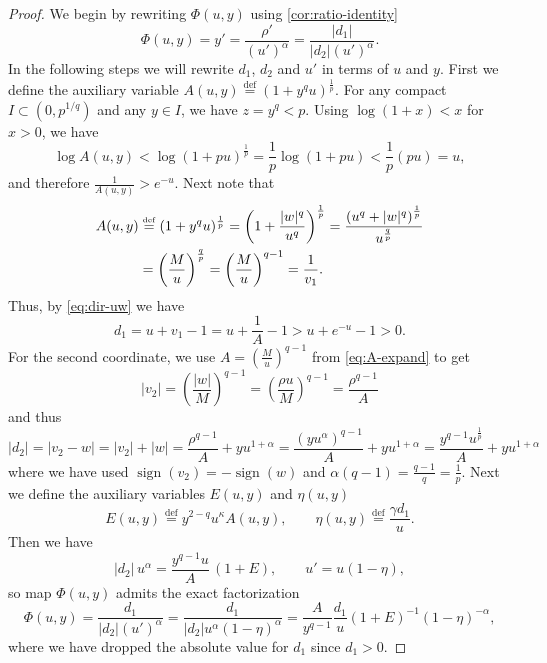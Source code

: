 \documentclass{article}
\DeclareMathOperator{\sign}{sign}
\newcommand{\defi}{\stackrel{\mathrm{\scriptscriptstyle def}}{=}}
\begin{document}
\begin{proof}
    We begin by rewriting $\Phi(u,y)$ using \cref{cor:ratio-identity}
    \begin{equation}\label{eq:yprime-ratio}
        \Phi(u,y)= y'
        = \frac{\rho'}{(u')^\alpha}
        = \frac{|d_1|}{|d_2|(u')^\alpha}.
    \end{equation}
    In the following steps we will rewrite $d_1$, $d_2$ and $u'$ in terms of $u$ and $y$.
    First we define the auxiliary variable $A(u,y)\defi (1+y^q u)^{\frac1p}$.
    For any compact $I \subset (0,p^{1/q})$ and any $y \in I$, we have $z = y^q < p$.
    Using $\log(1+x) < x$ for $x > 0$, we have
    \[
        \log A(u,y) < \log (1+p u)^{\frac1p} = \frac1p \log (1+p u) < \frac1p (p u) = u,
    \]
    and therefore $\frac{1}{A(u,y)} > e^{-u}$.
    Next note that
    \begin{align}
        \label{eq:A-expand}
        A(u,y)&\defi (1+y^q u)^{\frac1p}
        = \left( 1 + \frac{|w|^q}{u^q}\right)^{\frac1p}
        =\frac{\left(u^q + |w|^q\right)^{\frac1p}}{u^{\frac qp}} \notag\\
        &= \left(\frac{M}{u}\right)^{\frac qp} = \left(\frac{M}{u}\right)^{q-1} = \frac{1}{v_1}.
    \end{align}
    Thus, by \eqref{eq:dir-uw} we have
    \begin{equation}
        \label{eq:d1-expand}
        d_1 = u + v_1 - 1 = u + \frac{1}{A} - 1 > u + e^{-u} - 1 > 0.
    \end{equation}
    For the second coordinate, we use $A = \left( \frac{M}{u}\right)^{q-1}$ from \eqref{eq:A-expand} to get
    \[
        |v_2| = \left(\frac{|w|}{M}\right)^{q-1} = \left(\frac{\rho u}{M}\right)^{q-1} = \frac{\rho^{q-1}}{A}
    \]
    and thus
    \begin{equation}
        \label{eq:d2-abs-expand}
        |d_2| = |v_2 - w|
        = |v_2|+|w|
        = \frac{\rho^{q-1}}{A} + y u^{1+\alpha}
        = \frac{(y u^\alpha)^{q-1}}{A} + y u^{1+\alpha}
        = \frac{y^{q-1}u^{\frac 1p}}{A} + y u^{1+\alpha}
    \end{equation}
    where we have used $\sign(v_2) = -\sign(w)$ and $\alpha(q-1)=\frac{q-1}{q}=\frac{1}{p}$.
    Next we define the auxiliary variables $E(u,y)$ and $\eta(u,y)$
    \[
        E(u,y)\defi y^{2-q}u^\kappa A(u,y),
        \qquad
        \eta(u,y)\defi \frac{\gamma d_1}{u}.
    \]
    Then we have
    \[
        |d_2|\,u^\alpha = \frac{y^{q-1}u}{A}\,(1+E),
        \qquad
        u'=u(1-\eta),
    \]
    so map $\Phi(u,y)$ admits the exact factorization
    \begin{equation}\label{eq:phi-factorization}
        \Phi(u,y) = \frac{d_1}{|d_2|(u')^\alpha}
        = \frac{d_1}{|d_2|u^\alpha(1-\eta)^\alpha}
        = \frac{A}{y^{q-1}}\frac{d_1}{u}(1+E)^{-1} (1-\eta)^{-\alpha},
    \end{equation}
    where we have dropped the absolute value for $d_1$ since $d_1 > 0$.


\end{proof}
\end{document}
